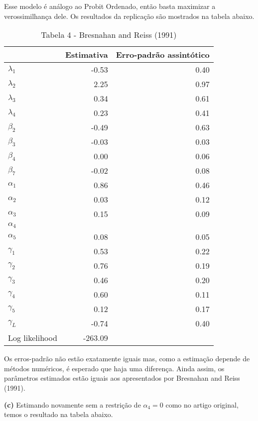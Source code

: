 \documentclass[
  12pt,
]{article}
\begin{document}
Esse modelo é análogo ao Probit Ordenado, então basta maximizar a
verossimilhança dele. Os resultados da replicação são mostrados na
tabela abaixo.

\begin{table}[H]

\caption{\label{tab:unnamed-chunk-7}Tabela 4 - Bresnahan and Reiss (1991)}
\centering
\begin{tabular}[t]{lrr}
\toprule
  & Estimativa & Erro-padrão assintótico\\
\midrule
$\lambda_1$ & -0.53 & 0.40\\
$\lambda_2$ & 2.25 & 0.97\\
$\lambda_3$ & 0.34 & 0.61\\
$\lambda_4$ & 0.23 & 0.41\\
$\beta_2$ & -0.49 & 0.63\\
$\beta_3$ & -0.03 & 0.03\\
$\beta_4$ & 0.00 & 0.06\\
$\beta_7$ & -0.02 & 0.08\\
$\alpha_1$ & 0.86 & 0.46\\
$\alpha_2$ & 0.03 & 0.12\\
$\alpha_3$ & 0.15 & 0.09\\
$\alpha_4$ &  & \\
$\alpha_5$ & 0.08 & 0.05\\
$\gamma_1$ & 0.53 & 0.22\\
$\gamma_2$ & 0.76 & 0.19\\
$\gamma_3$ & 0.46 & 0.20\\
$\gamma_4$ & 0.60 & 0.11\\
$\gamma_5$ & 0.12 & 0.17\\
$\gamma_L$ & -0.74 & 0.40\\
Log likelihood & -263.09 & \\
\bottomrule
\end{tabular}
\end{table}

Os erros-padrão não estão exatamente iguais mas, como a estimação
depende de métodos numéricos, é esperado que haja uma diferença. Ainda
assim, os parâmetros estimados estão iguais aos apresentados por
Bresnahan and Reiss (1991).

\textbf{(c)} Estimando novamente sem a restrição de \(\alpha_4 = 0\)
como no artigo original, temos o resultado na tabela abaixo.
\end{document}
